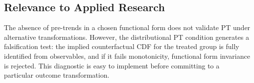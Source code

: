 \documentclass[12pt]{article}
\theoremstyle{remark}
\begin{document}
\subsection*{Relevance to Applied Research}

The absence of pre-trends in a chosen functional form does not validate PT under alternative transformations. However, the distributional PT condition generates a falsification test: the implied counterfactual CDF for the treated group is fully identified from observables, and if it fails monotonicity, functional form invariance is rejected. This diagnostic is easy to implement before committing to a particular outcome transformation.




\end{document}
